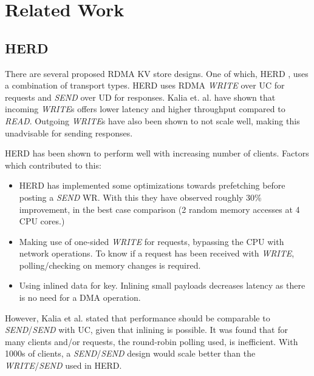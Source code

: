 
\chapter{Related Work}\label{ch:related-work} %



\ifpdf
    \graphicspath{{7/figures/PNG/}{7/figures/PDF/}{7/figures/}}
\else
    \graphicspath{{7/figures/EPS/}{7/figures/}}
\fi


%
\section{HERD}
There are several proposed RDMA KV store designs.
One of which, HERD \cite{kalia2014using}, uses a combination of transport types.
HERD uses RDMA \textit{WRITE} over UC for requests and \textit{SEND} over UD for responses.
Kalia et. al. have shown that incoming \textit{WRITE}s offers lower latency and higher throughput compared to \textit{READ}.
Outgoing \textit{WRITE}s have also been shown to not scale well, making this unadvisable for sending responses.

HERD has been shown to perform well with increasing number of clients.
Factors which contributed to this:
\begin{itemize}
    \item HERD has implemented some optimizations towards prefetching before posting a \textit{SEND} WR.
    With this they have observed roughly 30\% improvement, in the best case comparison (2 random memory accesses at 4 CPU cores.)
    \item Making use of one-sided \textit{WRITE} for requests, bypassing the CPU with network operations.
    To know if a request has been received with \textit{WRITE}, polling/checking on memory changes is required.
    \item Using inlined data for key.
    Inlining small payloads decreases latency as there is no need for a DMA operation.
\end{itemize}

However, Kalia et al. stated that performance should be comparable to \textit{SEND}/\textit{SEND} with UC, given that inlining is possible.
It was found that for many clients and/or requests, the round-robin polling used, is inefficient.
With 1000s of clients, a \textit{SEND}/\textit{SEND} design would scale better than the \textit{WRITE}/\textit{SEND} used in HERD.


